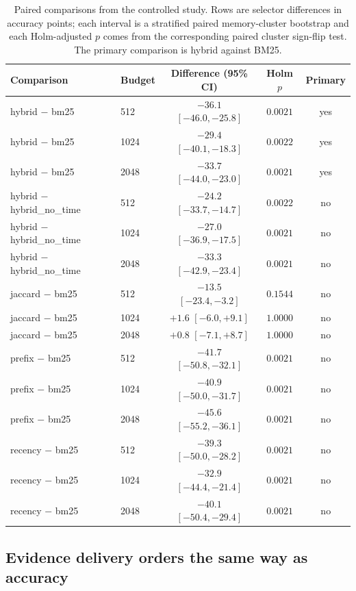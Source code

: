 \begin{table}[htbp]
\centering
\small
\caption{Paired comparisons from the controlled study. Rows are selector differences in
accuracy points; each interval is a stratified paired memory-cluster bootstrap and each
Holm-adjusted $p$ comes from the corresponding paired cluster sign-flip test. The primary
comparison is hybrid against BM25.}
\label{tab:controlled_pairs}
\begin{tabular}{llccc}
\toprule
Comparison & Budget & Difference (95\% CI) & Holm $p$ & Primary \\
\midrule
hybrid $-$ bm25 & 512  & $-36.1$ $[-46.0,-25.8]$ & $0.0021$ & yes \\
hybrid $-$ bm25 & 1024 & $-29.4$ $[-40.1,-18.3]$ & $0.0022$ & yes \\
hybrid $-$ bm25 & 2048 & $-33.7$ $[-44.0,-23.0]$ & $0.0021$ & yes \\
\midrule
hybrid $-$ hybrid\_no\_time & 512  & $-24.2$ $[-33.7,-14.7]$ & $0.0022$ & no \\
hybrid $-$ hybrid\_no\_time & 1024 & $-27.0$ $[-36.9,-17.5]$ & $0.0021$ & no \\
hybrid $-$ hybrid\_no\_time & 2048 & $-33.3$ $[-42.9,-23.4]$ & $0.0021$ & no \\
\midrule
jaccard $-$ bm25 & 512  & $-13.5$ $[-23.4,-3.2]$  & $0.1544$ & no \\
jaccard $-$ bm25 & 1024 & $+1.6$ $[-6.0,+9.1]$    & $1.0000$ & no \\
jaccard $-$ bm25 & 2048 & $+0.8$ $[-7.1,+8.7]$    & $1.0000$ & no \\
\midrule
prefix $-$ bm25  & 512  & $-41.7$ $[-50.8,-32.1]$ & $0.0021$ & no \\
prefix $-$ bm25  & 1024 & $-40.9$ $[-50.0,-31.7]$ & $0.0021$ & no \\
prefix $-$ bm25  & 2048 & $-45.6$ $[-55.2,-36.1]$ & $0.0021$ & no \\
recency $-$ bm25 & 512  & $-39.3$ $[-50.0,-28.2]$ & $0.0021$ & no \\
recency $-$ bm25 & 1024 & $-32.9$ $[-44.4,-21.4]$ & $0.0021$ & no \\
recency $-$ bm25 & 2048 & $-40.1$ $[-50.4,-29.4]$ & $0.0021$ & no \\
\bottomrule
\end{tabular}
\end{table}

\FloatBarrier

\subsection{Evidence delivery orders the same way as accuracy}

